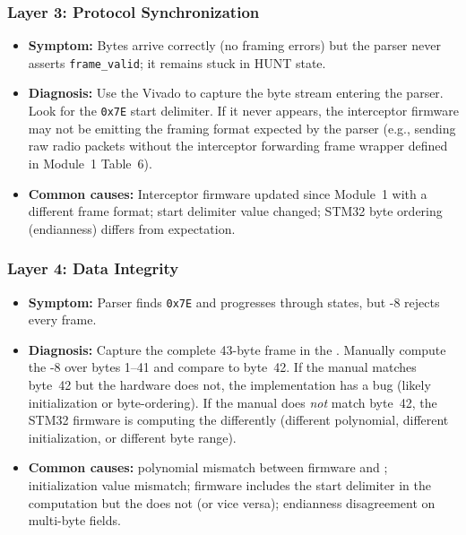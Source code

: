 \documentclass[11pt,letterpaper]{article}
\begin{document}
	\subsubsection{Layer 3: Protocol Synchronization}

	\begin{itemize}[leftmargin=2em]
		\item \textbf{Symptom:} Bytes arrive correctly (no framing errors) but the parser never asserts \texttt{frame\_valid}; it remains stuck in HUNT state.
		\item \textbf{Diagnosis:} Use the Vivado \ILA{} to capture the byte stream entering the parser. Look for the \texttt{0x7E} start delimiter. If it never appears, the interceptor firmware may not be emitting the framing format expected by the parser (e.g., sending raw radio packets without the interceptor forwarding frame wrapper defined in Module~1 Table~6).
		\item \textbf{Common causes:} Interceptor firmware updated since Module~1 with a different frame format; start delimiter value changed; STM32 byte ordering (endianness) differs from \FPGA{} expectation.
	\end{itemize}

	\subsubsection{Layer 4: Data Integrity}

	\begin{itemize}[leftmargin=2em]
		\item \textbf{Symptom:} Parser finds \texttt{0x7E} and progresses through states, but \CRC{}-8 rejects every frame.
		\item \textbf{Diagnosis:} Capture the complete 43-byte frame in the \ILA{}. Manually compute the \CRC{}-8 over bytes 1--41 and compare to byte~42. If the manual \CRC{} matches byte~42 but the hardware \CRC{} does not, the \VHDL{} \CRC{} implementation has a bug (likely initialization or byte-ordering). If the manual \CRC{} does \emph{not} match byte~42, the STM32 firmware is computing the \CRC{} differently (different polynomial, different initialization, or different byte range).
		\item \textbf{Common causes:} \CRC{} polynomial mismatch between firmware and \RTL{}; \CRC{} initialization value mismatch; firmware includes the start delimiter in the \CRC{} computation but the \RTL{} does not (or vice versa); endianness disagreement on multi-byte fields.
	\end{itemize}
\end{document}
